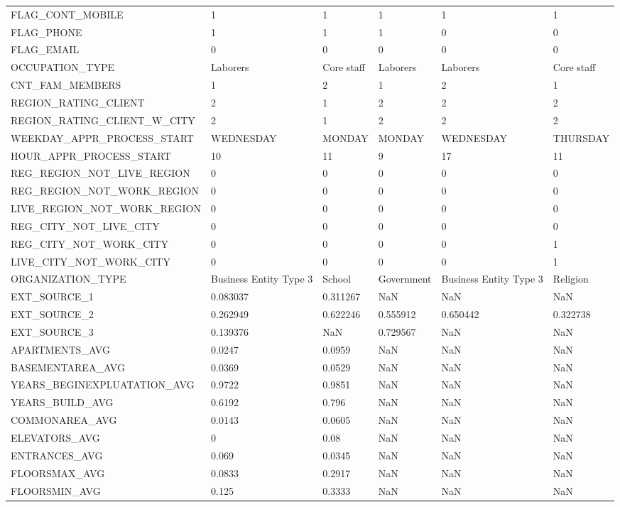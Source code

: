 \documentclass[12pt, letterpaper]{article}
\begin{document}
\begin{appendices}
{\begin{longtable}[c]{| l || p{2cm} | p{2cm} | p{2cm} | p{2cm} | p{2cm} |}
FLAG_CONT_MOBILE	&	1	&	1	&	1	&	1	&	1	\\
FLAG_PHONE	&	1	&	1	&	1	&	0	&	0	\\
FLAG_EMAIL	&	0	&	0	&	0	&	0	&	0	\\
OCCUPATION_TYPE	&	Laborers	&	Core staff	&	Laborers	&	Laborers	&	Core staff	\\
CNT_FAM_MEMBERS	&	1	&	2	&	1	&	2	&	1	\\
REGION_RATING_CLIENT	&	2	&	1	&	2	&	2	&	2	\\
REGION_RATING_CLIENT_W_CITY	&	2	&	1	&	2	&	2	&	2	\\
WEEKDAY_APPR_PROCESS_START	&	WEDNESDAY	&	MONDAY	&	MONDAY	&	WEDNESDAY	&	THURSDAY	\\
HOUR_APPR_PROCESS_START	&	10	&	11	&	9	&	17	&	11	\\
REG_REGION_NOT_LIVE_REGION	&	0	&	0	&	0	&	0	&	0	\\
REG_REGION_NOT_WORK_REGION	&	0	&	0	&	0	&	0	&	0	\\
LIVE_REGION_NOT_WORK_REGION	&	0	&	0	&	0	&	0	&	0	\\
REG_CITY_NOT_LIVE_CITY	&	0	&	0	&	0	&	0	&	0	\\
REG_CITY_NOT_WORK_CITY	&	0	&	0	&	0	&	0	&	1	\\
LIVE_CITY_NOT_WORK_CITY	&	0	&	0	&	0	&	0	&	1	\\
ORGANIZATION_TYPE	&	Business Entity Type 3	&	School	&	Government	&	Business Entity Type 3	&	Religion	\\
EXT_SOURCE_1	&	0.083037	&	0.311267	&	NaN	&	NaN	&	NaN	\\
EXT_SOURCE_2	&	0.262949	&	0.622246	&	0.555912	&	0.650442	&	0.322738	\\
EXT_SOURCE_3	&	0.139376	&	NaN	&	0.729567	&	NaN	&	NaN	\\
APARTMENTS_AVG	&	0.0247	&	0.0959	&	NaN	&	NaN	&	NaN	\\
BASEMENTAREA_AVG	&	0.0369	&	0.0529	&	NaN	&	NaN	&	NaN	\\
YEARS_BEGINEXPLUATATION_AVG	&	0.9722	&	0.9851	&	NaN	&	NaN	&	NaN	\\
YEARS_BUILD_AVG	&	0.6192	&	0.796	&	NaN	&	NaN	&	NaN	\\
COMMONAREA_AVG	&	0.0143	&	0.0605	&	NaN	&	NaN	&	NaN	\\
ELEVATORS_AVG	&	0	&	0.08	&	NaN	&	NaN	&	NaN	\\
ENTRANCES_AVG	&	0.069	&	0.0345	&	NaN	&	NaN	&	NaN	\\
FLOORSMAX_AVG	&	0.0833	&	0.2917	&	NaN	&	NaN	&	NaN	\\
FLOORSMIN_AVG	&	0.125	&	0.3333	&	NaN	&	NaN	&	NaN	\\

\end{longtable}}
\end{appendices}
\end{document}
